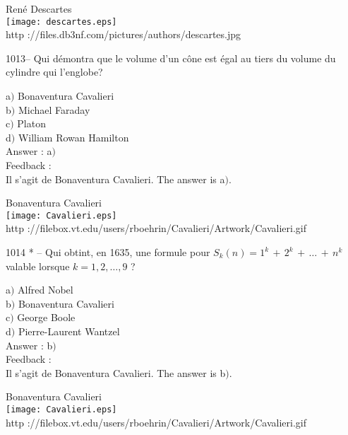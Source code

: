 \documentclass[letterpaper, 12pt]{article}
\begin{document}
        \begin{center}
        Ren\'e Descartes\\
    \texttt{[image: descartes.eps]}\\
        {\footnotesize http
://files.db3nf.com/pictures/authors/descartes.jpg}
    \end{center}

1013-- Qui d\'emontra que le volume d'un c\^one est \'egal au tiers
du volume du cylindre qui l'englobe?

a$)$ Bonaventura Cavalieri \\
b$)$ Michael Faraday \\
c$)$ Platon \\
d$)$ William Rowan Hamilton\\

Answer : a$)$\\

Feedback : \\
Il s'agit de Bonaventura Cavalieri.
The answer is a$)$.\\

        \begin{center}
        Bonaventura Cavalieri\\
    \texttt{[image: Cavalieri.eps]}\\
        {\footnotesize http
://filebox.vt.edu/users/rboehrin/Cavalieri/Artwork/Cavalieri.gif}
    \end{center}

1014 * -- Qui obtint, en 1635, une formule pour
$S_k(n)=1^k\,+\,2^k\,+\,\ldots\,+\,n^k$ valable lorsque
$k=1,2,\ldots,9$ ?

a$)$ Alfred Nobel \\
b$)$ Bonaventura Cavalieri \\
c$)$ George Boole \\
d$)$ Pierre-Laurent Wantzel\\

Answer : b$)$\\

Feedback : \\
Il s'agit de Bonaventura Cavalieri.
The answer is b$)$.\\

        \begin{center}
        Bonaventura Cavalieri\\
    \texttt{[image: Cavalieri.eps]}\\
        {\footnotesize http
://filebox.vt.edu/users/rboehrin/Cavalieri/Artwork/Cavalieri.gif}
    \end{center}
\end{document}
